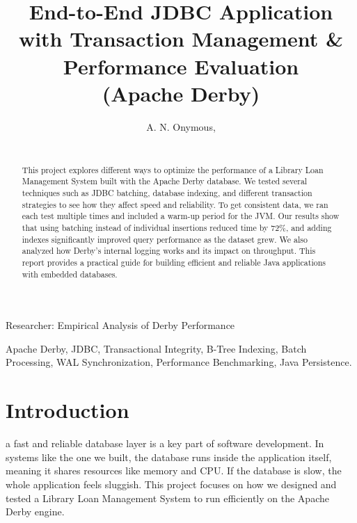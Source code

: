 \documentclass[journal]{IEEEtran}
\begin{document}
\title{End-to-End JDBC Application with Transaction Management \& Performance
Evaluation \\ (Apache Derby)}

\author{ A. N. Onymous, \\  \\
}

{Researcher: Empirical Analysis of Derby Performance}

\maketitle

\begin{abstract}
This project explores different ways to optimize the performance of a Library Loan Management System built with the Apache Derby database. We tested several techniques such as JDBC batching, database indexing, and different transaction strategies to see how they affect speed and reliability. To get consistent data, we ran each test multiple times and included a warm-up period for the JVM. Our results show that using batching instead of individual insertions reduced time by 72\%, and adding indexes significantly improved query performance as the dataset grew. We also analyzed how Derby's internal logging works and its impact on throughput. This report provides a practical guide for building efficient and reliable Java applications with embedded databases.
\end{abstract}

\begin{IEEEkeywords}
Apache Derby, JDBC, Transactional Integrity, B-Tree Indexing, Batch Processing, WAL Synchronization, Performance Benchmarking, Java Persistence.
\end{IEEEkeywords}

\section{Introduction}

 a fast and reliable database layer is a key part of software development. In systems like the one we built, the database runs inside the application itself, meaning it shares resources like memory and CPU. If the database is slow, the whole application feels sluggish. This project focuses on how we designed and tested a Library Loan Management System to run efficiently on the Apache Derby engine.
\end{document}
